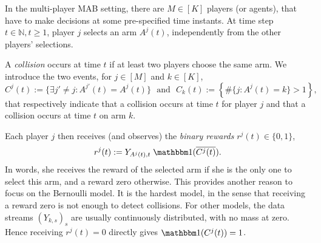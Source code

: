 


In the multi-player MAB setting, there are $M \in [K]$ players (or agents),
that have to make decisions at some pre-specified time instants.
At time step $t \in\mathbb{N},t\geq1$, player $j$ selects an arm $A^j(t)$, independently from the other players' selections.

\begin{definition}
  A \emph{collision} occurs at time $t$ if at least two players choose the same arm.
  We introduce the two events, for $j\in[M]$ and $k\in[K]$,
  \begin{equation}
    C^j(t) :=  \{ \exists j' \neq j : A^{j'}(t) = A^j(t) \}
    \ \ \ \text{and} \ \ \ C_k(t) :=  \left\{ \# \{ j : A^j(t) = k\} > 1 \right\},
  \end{equation}
  that respectively indicate that a collision occurs at time $t$ for player $j$ and that a collision occurs at time $t$ on arm $k$.
\end{definition}

Each player $j$ then receives (and observes) the \emph{binary rewards}
$r^j(t) \in \{0,1\}$,
\begin{equation}
  r^j(t) := Y_{A^j(t),t} \; \indic(\overline{C^j(t)}).
\end{equation}
In words, she receives the reward of the selected arm if she is the only one to select this arm, and a reward zero otherwise.
This provides another reason to focus on the Bernoulli model. It is the hardest model, in the sense that receiving a reward zero is not enough to detect collisions. For other models, the data streams $(Y_{k,s})_s$ are usually continuously distributed, with no mass at zero. Hence receiving $r^j(t) = 0$ directly gives $\indic(C^j(t)) = 1$.

